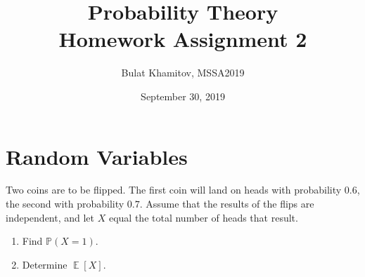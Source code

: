 \documentclass{article}[12pt]
\title{Probability Theory \\ Homework Assignment 2}
\author{Bulat Khamitov, MSSA2019}
\date{September 30, 2019}
\newenvironment{problem}[1]
  {\renewcommand\theinnercustomprblm{#1}\innercustomprblm}
  {\endinnercustomprblm}
\DeclareMathOperator{\E}{\mathbb{E}}
\begin{document}
\maketitle

\section{Random Variables}

\begin{problem}{4.25}\normalfont
Two coins are to be flipped.
The first coin will land on heads with probability $0.6$, the second with probability $0.7$.
Assume that the results of the flips are independent, and let $X$ equal the total number of heads that result.
\begin{enumerate}[label=(\alph*)]
    \item Find $\mathbb{P}(X = 1)$.
    \item Determine $\E[X]$.
\end{enumerate}
\end{problem}
\end{document}

